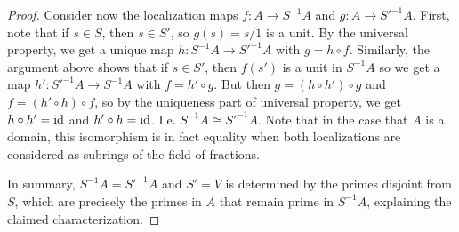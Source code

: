 \begin{proof}
	Consider now the localization maps $f : A \to S^{-1}A$ and $g : A \to {S'}^{-1}A$. First, note that if $s \in S$, then $s \in S'$, so $g(s) = s/1$ is a unit. By the universal property, we get a unique map $h : S^{-1}A \to {S'}^{-1}A$ with $g = h \circ f$. Similarly, the argument above shows that if $s \in S'$, then $f(s')$ is a unit in $S^{-1}A$ so we get a map $h' : {S'}^{-1}A \to S^{-1}A$ with $f = h' \circ g$. But then $g = (h \circ h') \circ g$ and $f = (h' \circ h) \circ f$, so by the uniqueness part of universal property, we get $h \circ h' = \operatorname{id}$ and $h' \circ h = \operatorname{id}$. I.e. $S^{-1}A \cong {S'}^{-1}A$. Note that in the case that $A$ is a domain, this isomorphism is in fact equality when both localizations are considered as subrings of the field of fractions.
	
	In summary, $S^{-1}A = {S'}^{-1}A$ and $S' = V$ is determined by the primes disjoint from $S$, which are precisely the primes in $A$ that remain prime in $S^{-1}A$, explaining the claimed characterization.
\end{proof}
